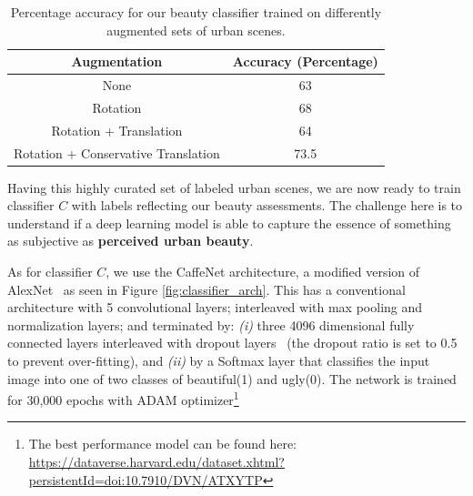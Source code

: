 \label{sec:framework}
\begin{table}[ht!]
    \centering
    \begin{tabular}{|c|c|}
        \hline
        \textbf{Augmentation} & \textbf{Accuracy (Percentage)}\\
        \hline
        None & 63 \\
        \hline
        Rotation  & 68 \\
        \hline
        Rotation + Translation  & 64 \\
        \hline
        Rotation + Conservative Translation & 73.5 \\
        \hline
    \end{tabular}
    \caption{Percentage accuracy for our beauty classifier trained on differently augmented sets of  urban scenes.}
    \label{tab:classifier}
    \vspace{-10mm}
\end{table}

Having this highly curated set of labeled urban scenes, we are now ready to train classifier $C$ with labels reflecting our beauty assessments. The challenge here is to understand if a deep learning model is able to capture the essence of something as subjective as \textbf{perceived urban beauty}.

As for classifier $C$, we use the CaffeNet architecture, a modified version of AlexNet~\cite{krizhevsky2012imagenet,szegedy2015going} as seen in Figure \ref{fig:classifier_arch}. This has a conventional architecture with 5 convolutional layers; interleaved with  max pooling and normalization layers; and terminated by: \emph{(i)} three 4096 dimensional fully connected layers interleaved with dropout layers~\cite{srivastava2014dropout} (the dropout ratio is set to 0.5 to prevent over-fitting), and \emph{(ii)} by a Softmax layer that classifies the input image into one of two classes of beautiful(1) and ugly(0). The network is trained for 30,000 epochs with ADAM optimizer\footnote{The best performance model can be found here: \url{https://dataverse.harvard.edu/dataset.xhtml?persistentId=doi:10.7910/DVN/ATXYTP}}

